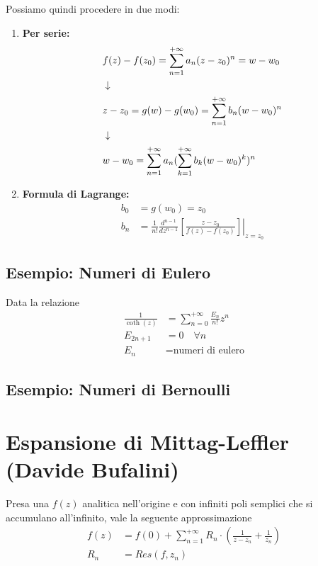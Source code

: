 Possiamo quindi procedere in due modi:
\begin{enumerate}
	\item \textbf{Per serie:}
	\begin{align}
		&f(z) - f(z_0) = \sum_{n=1}^{+\infty} a_n (z-z_0)^n= w-w_0\\ &\downarrow \nonumber \\
		& z -z_0 = g(w) - g(w_0) = 	 \sum_{n=1}^{+\infty} b_n(w-w_0)^n	\\ &\downarrow \nonumber \\
		& w - w_0 = \sum_{n=1}^{+\infty} a_n (\sum_{k=1}^{+\infty} b_k (w-w_0)^k)^n
	\end{align}
	\item \textbf{Formula di Lagrange:}
	\begin{align}
		b_0 &= g(w_0) = z_0\\
		b_n &= \frac{1}{n!} \frac{d^{n-1}}{dz^{n-1}} \left. \left[ \frac{z-z_0}{f(z) - f(z_0)} \right] \right|_{z=z_0}
	\end{align}
	
\end{enumerate}

\newpage

\subsection{Esempio: Numeri di Eulero}

Data la relazione
\begin{align}
	\frac{1}{\coth (z)} &= \sum_{n=0}^{+\infty} \frac{E_n}{n!}z^n\\
	E_{2n+1} &= 0 \quad \forall n\\
	E_n &= \text{numeri di eulero}
\end{align}

\subsection{Esempio: Numeri di Bernoulli}
\newpage


\section{Espansione di Mittag-Leffler (Davide Bufalini)}

Presa una $f(z)$ analitica nell'origine e con infiniti poli semplici che si accumulano all'infinito, vale la seguente approssimazione
\begin{align}
	f(z) &= f(0) + \sum_{n=1}^{+\infty} R_n \cdot \left( \frac{1}{z-z_n} + \frac{1}{z_n} \right)\\
	R_n &= Res(f, z_n)
\end{align}

